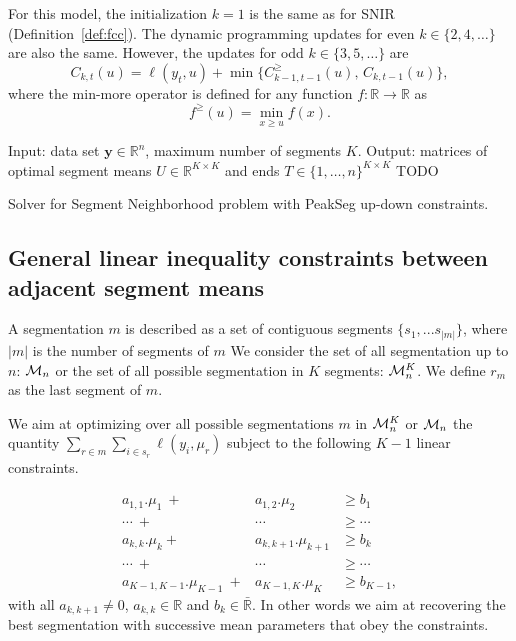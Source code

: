 \documentclass{article}
\newcommand{\RR}{\mathbb R}
\begin{document}
For this model, the initialization $k=1$ is the same as for SNIR
(Definition~\ref{def:fcc}). The dynamic programming updates for even
$k\in\{2, 4, \dots\}$ are also the same. However, the updates for odd
$k\in\{3, 5, \dots\}$ are
\begin{equation}
  C_{k,t}(u) = \ell(y_t, u) + \min\{
  C_{k-1,t-1}^\geq(u),\, C_{k,t-1}(u)
  \},
\end{equation}
where the min-more operator is defined for any function $f:\RR\rightarrow\RR$ as
\begin{equation}
  \label{eq:min-more-def}
  f^\geq(u) = \min_{x\geq u} f(x).
\end{equation}

\begin{algorithm}[H]
\begin{algorithmic}[1]
\STATE Input: data set $\mathbf y\in\RR^n$, maximum number of segments $K$.
\STATE Output: matrices of optimal segment means $U\in\RR^{K\times K}$ and ends $T\in\{1,\dots,n\}^{K\times K}$
\STATE TODO
\caption{\label{algo:PeakSegPDPA}Solver for Segment Neighborhood problem with PeakSeg up-down constraints.}
\end{algorithmic}
\end{algorithm}

\subsection{General linear inequality constraints
  between adjacent segment means}

A segmentation $m$ is described as a set of contiguous segments $\{s_1, ... s_{|m|} \}$, where $|m|$ is the number of segments of $m$
We consider the set of all segmentation up to $n$: $\mathcal{M}_n$ 
or the set of all possible segmentation in $K$ segments: $\mathcal{M}^K_n$.
We define $r_m$ as the last segment of $m$.

We aim at optimizing over all possible segmentations $m$ in $\mathcal{M}^K_n$ or $\mathcal{M}_n$
 the quantity
$\sum_{r \in m} \sum_{i \in s_{r}} \ell(y_i, \mu_{r})$ subject to
the following $K-1$ linear constraints. 

\begin{eqnarray*}
a_{1,1}.\mu_1 \ + & a_{1,2}.\mu_2  & \geq  b_1 \\
\cdots \ +&  \cdots & \geq \cdots \\
a_{k,k}.\mu_{k} + & a_{k,k+1}.\mu_{k+1}  & \geq  b_{k} \\
\cdots \ +&  \cdots & \geq \cdots  \\
a_{K-1,K-1}.\mu_{K-1} \ +& a_{K-1,K}.\mu_K & \geq  b_{K-1},
\end{eqnarray*}
with all $a_{k,k+1} \neq 0$, $a_{k,k} \in \mathbb{R}$ and
$b_{k} \in \bar{\mathbb{R}}.$ In other words we aim at recovering the
best segmentation with successive mean parameters that obey the
constraints.
\end{document}
